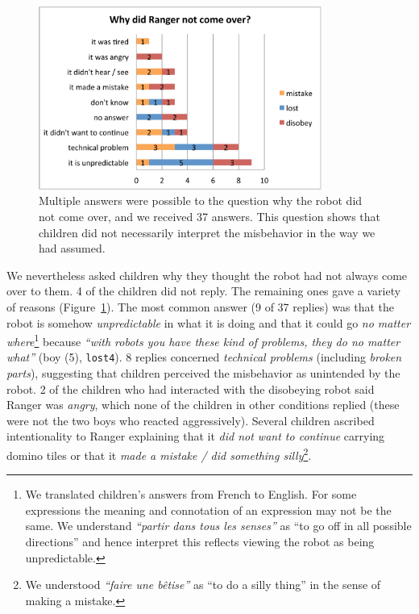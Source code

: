 \documentclass{sig-alternate}
\begin{document}
\begin{figure}[!h]
    \centering
    \includegraphics[height=6cm]{domino-why-misbehavior.pdf}   
    \caption[Why Did the Robot Misbehave?]{\small Multiple answers were possible
    to the question why the robot did not come over, and we received 37 answers.
    This question shows that children did not necessarily interpret the misbehavior
    in the way we had assumed.}

    \label{fig:domino-why-misbehavior}
\end{figure}	

We nevertheless asked children why they thought the robot had not always come
over to them. 4 of the children did not reply. The remaining ones gave a variety
of reasons (Figure~\ref{fig:domino-why-misbehavior}). The most common answer (9
of 37 replies) was that the robot is somehow \textit{unpredictable} in what it
is doing and that it could go \textit{no matter where}\footnote{We translated
children's answers from French to English. For some expressions the meaning and
connotation of an expression may not be the same. We understand \textit{``partir
dans tous les senses''} as ``to go off in all possible directions'' and hence
interpret this reflects viewing the robot as being unpredictable.} because
\textit{``with robots you have these kind of problems, they do no matter what''}
(boy (5), \texttt{lost4}). 8 replies concerned \textit{technical problems}
(including \textit{broken parts}), suggesting that children perceived the
misbehavior as unintended by the robot. 2 of the children who had interacted
with the disobeying robot said Ranger was \textit{angry}, which none of the
children in other conditions replied (these were not the two boys who reacted
aggressively). Several children ascribed intentionality to Ranger explaining
that it \textit{did not want to continue} carrying domino tiles or that it
\textit{made a mistake / did something silly}\footnote{We understood
\textit{``faire une bêtise''} as ``to do a silly thing'' in the sense of making
a mistake.}.
\end{document}
